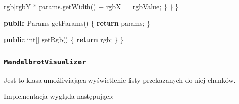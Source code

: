 \documentclass[11pt]{article}
\newenvironment{Shaded}{}{}
\newcommand{\KeywordTok}[1]{\textcolor[rgb]{0.00,0.44,0.13}{\textbf{{#1}}}}
\newcommand{\DataTypeTok}[1]{\textcolor[rgb]{0.56,0.13,0.00}{{#1}}}
\newcommand{\FunctionTok}[1]{\textcolor[rgb]{0.02,0.16,0.49}{{#1}}}
\newcommand{\NormalTok}[1]{{#1}}
\newcommand{\ControlFlowTok}[1]{\textcolor[rgb]{0.00,0.44,0.13}{\textbf{{#1}}}}
\newcommand{\OperatorTok}[1]{\textcolor[rgb]{0.40,0.40,0.40}{{#1}}}
\begin{document}
\begin{Shaded}
\begin{Highlighting}[]
\NormalTok{                rgb}\OperatorTok{[}\NormalTok{rgbY }\OperatorTok{*}\NormalTok{ params}\OperatorTok{.}\FunctionTok{getWidth}\OperatorTok{()} \OperatorTok{+}\NormalTok{ rgbX}\OperatorTok{]} \OperatorTok{=}\NormalTok{ rgbValue}\OperatorTok{;}
            \OperatorTok{\}}
        \OperatorTok{\}}
    \OperatorTok{\}}

    \KeywordTok{public}\NormalTok{ Params }\FunctionTok{getParams}\OperatorTok{()} \OperatorTok{\{}
        \ControlFlowTok{return}\NormalTok{ params}\OperatorTok{;}
    \OperatorTok{\}}

    \KeywordTok{public} \DataTypeTok{int}\OperatorTok{[]} \FunctionTok{getRgb}\OperatorTok{()} \OperatorTok{\{}
        \ControlFlowTok{return}\NormalTok{ rgb}\OperatorTok{;}
    \OperatorTok{\}}
\OperatorTok{\}}
\end{Highlighting}
\end{Shaded}

    \hypertarget{mandelbrotvisualizer}{%
\subsubsection{\texorpdfstring{\texttt{MandelbrotVisualizer}}{MandelbrotVisualizer}}\label{mandelbrotvisualizer}}

Jest to klasa umożliwiająca wyświetlenie listy przekazanych do niej
chunków.

Implementacja wygląda następująco:
\end{document}
